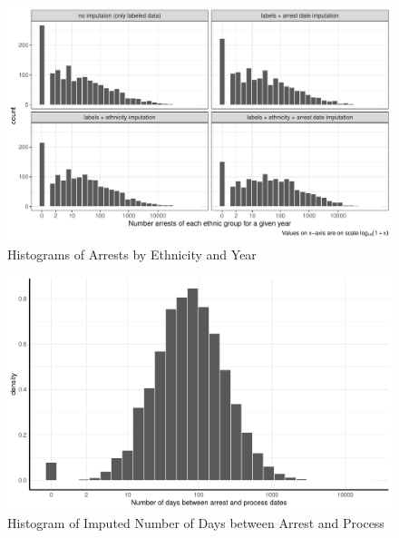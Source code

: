 \begin{figure}[!h]
\centering
\includegraphics[width=1.2\textwidth]{plots/arrests/facet_hist.pdf}
\caption{Histograms of Arrests by Ethnicity and Year}
\label{fig:facet_by_year}
\end{figure}
\begin{figure}[!h]

\centering
\includegraphics[width=1.2\textwidth]{plots/imputing_arrest_date/mixed_model_preds_hist.pdf}
\caption{Histogram of Imputed Number of Days between Arrest and Process}
\label{fig:mixed_model_preds_hist}
\end{figure}


%
